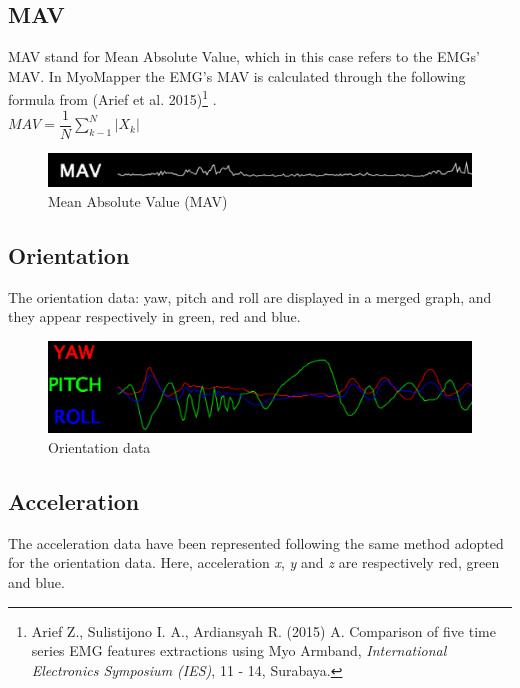 \documentclass[12pt,a4paper]{article}
\begin{document}
		\subsection{MAV}
		MAV stand for Mean Absolute Value, which in this case refers to the EMGs' MAV. In MyoMapper the EMG's MAV is calculated through the following formula from (Arief et al. 2015)\footnote{Arief Z., Sulistijono I. A., Ardiansyah R. (2015) A. Comparison of five time series EMG features extractions using Myo Armband, \textit{International Electronics Symposium (IES)}, 11 - 14, Surabaya.} . \\
		
		\begin{math}
		     MAV = \dfrac{1}{N} \displaystyle\sum_{k-1}^{N} \lvert X_{k} \rvert
		\end{math}
		
				\begin{figure}[h]
					\centering
					\includegraphics[width=0.6\linewidth]{../MyoMapper-MAV}
					\caption{Mean Absolute Value (MAV)}
					\label{fig:MyoMapper-MAV}
				\end{figure}
	
		\subsection{Orientation}
		The orientation data: yaw, pitch and roll are displayed in a merged graph, and they appear respectively in green, red and blue.
		
		\begin{figure}[h]
			\centering
			\includegraphics[width=0.6\linewidth]{../MyoMapper-YPR}
			\caption{Orientation data}
			\label{fig:MyoMapper-Orientation}
		\end{figure}
	
		\subsection{Acceleration}
		The acceleration data have been represented following the same method adopted for the orientation data. Here, acceleration \textit{x}, \textit{y} and \textit{z} are respectively red, green and blue.
	
\end{document}
